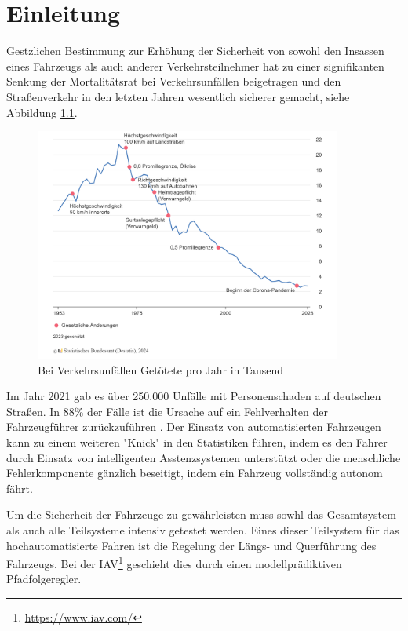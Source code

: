\chapter{Einleitung} \label{chap:Einleitung}
\thispagestyle{empty}
Gestzlichen Bestimmung zur Erhöhung der Sicherheit von sowohl den Insassen eines Fahrzeugs als auch anderer Verkehrsteilnehmer hat zu einer signifikanten Senkung der Mortalitätsrat bei Verkehrsunfällen beigetragen und den Straßenverkehr in den letzten Jahren wesentlich sicherer gemacht, siehe Abbildung \ref{fig:Statistik_Tote}.
\begin{figure} [H]
    \centering
    \includegraphics[width=0.9\textwidth]{figures/1_Einleitung/verkehrsunfaelle-getoetete-jahr.png}
    \caption{Bei Verkehrsunfällen Getötete pro Jahr in Tausend \cite{StBA2021}}
    \label{fig:Statistik_Tote}
\end{figure}
\noindent Im Jahr 2021 gab es über 250.000 Unfälle mit Personenschaden auf deutschen Straßen. In 88\% der Fälle ist die Ursache auf ein Fehlverhalten der Fahrzeugführer zurückzuführen \cite{StBA2021}. Der Einsatz von automatisierten Fahrzeugen kann zu einem weiteren "Knick" in den Statistiken führen, indem es den Fahrer durch Einsatz von intelligenten Asstenzsystemen unterstützt oder die menschliche Fehlerkomponente gänzlich beseitigt, indem ein Fahrzeug vollständig autonom fährt.

Um die Sicherheit der Fahrzeuge zu gewährleisten muss sowhl das Gesamtsystem als auch alle Teilsysteme intensiv getestet werden. Eines dieser Teilsystem für das hochautomatisierte Fahren ist die Regelung der Längs- und Querführung des Fahrzeugs. Bei der IAV\footnote{\url{https://www.iav.com/}} geschieht dies durch einen modellprädiktiven Pfadfolgeregler.\bigskip

